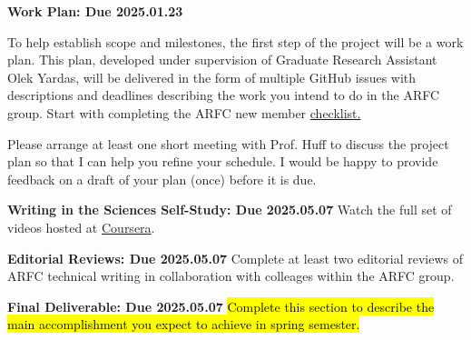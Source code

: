 \documentclass[12pts, answers]{exam}
\newcommand{\duedate}{2025.05.07}
\begin{document}
\begin{questions}
\addpoints
\question[10] \textbf{Work Plan: Due 2025.01.23}

To help establish scope and milestones, the first step of the project will be 
        a 
        work plan. This plan, developed under supervision of Graduate Research 
        Assistant Olek Yardas, will be delivered in the form of multiple GitHub 
        issues with descriptions and deadlines describing the work you intend 
        to do in the ARFC group. Start with completing the ARFC new member 
        \href{https://github.com/orgs/arfc/projects/37/views/1}{checklist.}

Please arrange at least one short meeting with Prof. Huff to discuss the project plan
so that I can help you refine your schedule. I would be happy to provide feedback 
on a draft of your plan (once) before it is due.

\question[20] \textbf{Writing in the Sciences Self-Study: Due \duedate}
        Watch the full set of videos hosted at
        \href{https://www.coursera.org/learn/sciwrite/}{Coursera}.

\question[20] \textbf{Editorial Reviews: Due \duedate}
Complete at least two editorial reviews of ARFC technical writing in 
        collaboration with colleages within the ARFC group. 

\question[60] \textbf{Final Deliverable: Due \duedate}
        \hl{Complete this section to describe the main accomplishment you 
        expect to achieve in spring semester.}

\end{questions}


%
%
\end{document}
